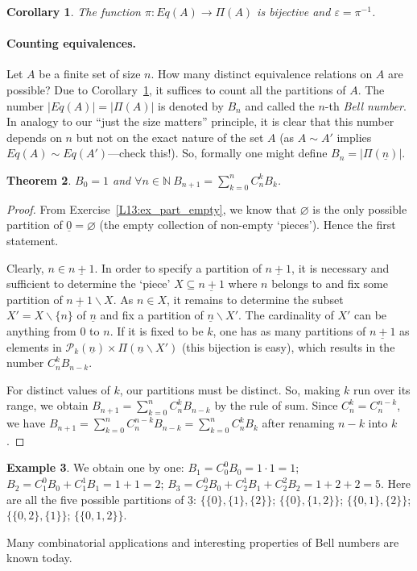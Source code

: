 \documentclass[12pt,notitlepage]{article}
\theoremstyle{plain}
\newtheorem{thm}{Theorem}[section]
\newtheorem{corr}[thm]{Corollary}
\theoremstyle{definition}
\newtheorem{exm}[thm]{Example}
\theoremstyle{plain}
\newcommand{\N}{\mathbb{N}}
\newcommand{\sbs}{\subseteq}
\renewcommand{\setminus}{\smallsetminus}
\newcommand{\void}{\varnothing}
\newcommand{\mP}{\mathcal{P}}
\newcommand{\eps}{\varepsilon}
\newcommand{\ul}[1]{\underline{#1}}
\newcommand{\1}{\mathbf{1}}
\newcommand{\0}{\mathbf{0}}
\begin{document}
\begin{corr}\label{L13:eq_part}
The function $\pi\colon Eq(A) \to \Pi(A)$ is bijective and $\eps = \pi^{-1}$.
\end{corr}

\paragraph{Counting equivalences.}
Let $A$ be a finite set of size $n$. How many distinct equivalence relations on $A$ are possible? Due to Corollary~\ref{L13:eq_part}, it suffices to count all the partitions of $A$. The number $|Eq(A)| = |\Pi(A)|$ is denoted by $B_n$ and called the $n$-th \emph{Bell number}. In analogy to our ``just the size matters'' principle, it is clear that this number depends on $n$ but not on the exact nature of the set $A$ (as $A \sim A'$ implies $Eq(A) \sim Eq(A')$---check this!). So, formally one might define $B_n = |\Pi(\ul{n})|$.

\begin{thm}
$B_0 = 1$ and $\forall n \in \N\ B_{n + 1} = \sum_{k = 0}^{n} C_n^k B_k$.
\end{thm}
\begin{proof}
From Exercise~\ref{L13:ex_part_empty}, we know that $\void$ is the only possible partition of $\ul{0} = \void$ (the empty collection of non-empty `pieces'). Hence the first statement.

Clearly, $n \in \ul{n+1}$. In order to specify a partition of $\ul{n+1}$, it is necessary and sufficient to determine the `piece' $X \sbs \ul{n+1}$ where $n$ belongs to and fix some partition of $\ul{n+1} \setminus X$. As $n \in X$, it remains to determine the subset $X' = X \setminus \{n\}$ of $\ul{n}$ and fix a partition of $\ul{n} \setminus X'$. The cardinality of $X'$ can be anything from $0$ to $n$. If it is fixed to be $k$, one has as many partitions of $\ul{n+1}$ as elements in $\mP_{k}(\ul{n}) \times \Pi(\ul{n} \setminus X')$ (this bijection is easy), which results in the number $C^k_n B_{n-k}$.

For distinct values of $k$, our partitions must be distinct. So, making $k$ run over its range, we obtain $B_{n+1} = \sum_{k=0}^n C^k_n B_{n-k}$ by the rule of sum. Since $C^k_n = C^{n - k}_n$, we have $B_{n+1} = \sum_{k=0}^n C^{n-k}_n B_{n-k} = \sum_{k=0}^n C^k_n B_k$ after renaming $n - k$ into $k$.
\end{proof}
\begin{exm}
We obtain one by one: $B_1 = C_0^0 B_0 = 1\cdot 1 = 1$; $B_2 = C_1^0 B_0 + C_1^1 B_1 = 1 + 1 = 2$; $B_3 = C_2^0 B_0 + C_2^1 B_1 + C_2^2 B_2 = 1 + 2 + 2 = 5$. Here are all the five possible partitions of $\ul{3}$: $\{\{0\}, \{1\}, \{2\} \}$; $\{\{0\}, \{1, 2\} \}$; $\{\{0, 1\}, \{2\} \}$; $\{\{0, 2\}, \{1\} \}$; $\{\{0, 1, 2\} \}$.
\end{exm}
\noindent Many combinatorial applications and interesting properties of Bell numbers are known today.
\end{document}
